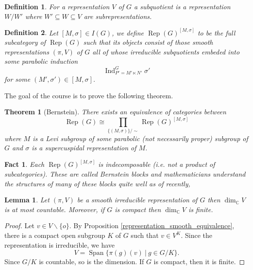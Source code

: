 \documentclass[8pt]{article}
\newtheorem{definition}{Definition}[section]
\newtheorem{lemma}{Lemma}[section]
\newtheorem{fact}{Fact}[section]
\newtheorem*{theorem*}{Theorem}
\DeclareMathOperator{\Ind}{Ind}
\DeclareMathOperator{\Rep}{Rep}
\DeclareMathOperator{\Span}{Span}
\newcommand{\C}[0]{\mathbb{C}}
\begin{document}
\begin{definition}
  For a representation $V$ of $G$ a subquotient is a representation $W/W'$ where $W'\subseteq W\subseteq V$ are subrepresentations.
\end{definition}

\begin{definition}
Let $[M,\sigma]\in I(G)$, we define $\Rep(G)^{[M,\sigma]}$ to be the full subcategory of $\Rep(G)$ such that its objects consist of those smooth representations $(\pi,V)$ of $G$ all of whose irreducible subquotients embeded into some parabolic induction 
\begin{equation*}
\Ind_{P'=M'\ltimes N'}^G \sigma'
\end{equation*}
for some $(M',\sigma')\in[M,\sigma]$.
\end{definition}

The goal of the course is to prove the following theorem.
\begin{theorem*}[Bernstein]
There exists an equivalence of categories between
\begin{equation*}
\Rep(G)\cong\prod_{\{(M,\sigma)\}/\sim}\Rep(G)^{[M,\sigma]}
\end{equation*}
where $M$ is a Levi subgroup of some parabolic (not necessarily proper) subgroup of $G$ and $\sigma$ is a supercuspidal representation of $M$.
\end{theorem*}

\begin{fact}
Each $\Rep(G)^{[M,\sigma]}$ is indecomposable (i.e. not a product of subcategories). These are called Bernstein blocks and mathematicians understand the structures of many of these blocks quite well as of recently,
\end{fact}

\begin{lemma}
Let $(\pi,V)$ be a smooth irreducible representation of $G$ then $\dim_\C V$ is at most countable. Moreover, if $G$ is compact then $\dim_\C V$ is finite.
\label{smooth_representation_dimension}
\end{lemma}

\begin{proof}
Let $v\in V\backslash\{o\}$. By Proposition \ref{representation_smooth_equivalence}, there is a compact open subgroup $K$ of $G$ such that $v\in V^K$. Since the representation is irreducible, we have
\begin{equation*}
V = \Span\{\pi(g)(v)\:|\: g\in G/K\}.
\end{equation*}
Since $G/K$ is countable, so is the dimension. If $G$ is compact, then it is finite.
\end{proof}
\end{document}
